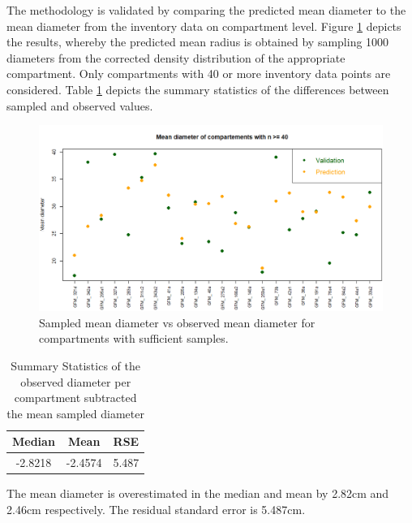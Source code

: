 
The methodology is validated by comparing the predicted mean diameter to the mean diameter from the inventory data on compartment level. Figure \ref{fig:radius} depicts the results, whereby the predicted mean radius is obtained by sampling 1000
diameters from the corrected density distribution of the appropriate compartment. Only compartments with 40 or more inventory data points are considered. Table \ref{summary statistics} depicts the summary
statistics of the differences between sampled and observed values.

\begin{figure}[H]
\centering
  \includegraphics[scale = 0.4]{radius.png}
  \caption{Sampled mean diameter vs observed mean diameter for compartments with sufficient samples.}
  \label{fig:radius}
\end{figure}

\begin{table}[H]
\setlength\arrayrulewidth{1pt}
\centering
\begin{adjustbox}{max width=\textwidth}

\begin{tabular}{|c|c|c|}
\hline 
\rowcolor{Gray}
\textbf{Median} & \textbf{Mean} & \textbf{RSE} \\ 
\hline 
-2.8218 & -2.4574 & 5.487 \\ 
\hline 
\end{tabular} 

\end{adjustbox}

\caption{Summary Statistics of the observed diameter per compartment subtracted the mean sampled diameter}
\label{summary statistics}
\end{table}

The mean diameter is overestimated in the median and mean by 2.82cm and 2.46cm respectively. The residual standard error is 5.487cm.